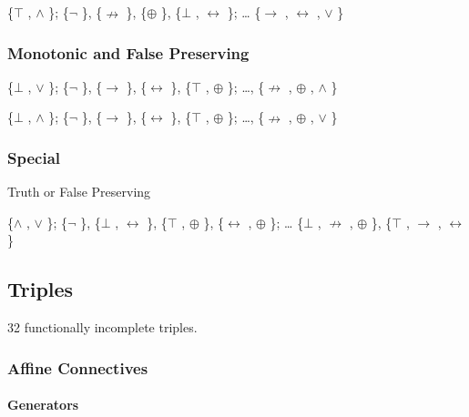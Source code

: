 \{$\top$ , $\land$ \}; \{$\neg$ \}, \{$\nrightarrow$ \}, \{$\oplus$ \}, \{$\bot$ , $\leftrightarrow$ \}; \ldots{} \{$\to$ , $\leftrightarrow$ , $\lor$ \}

\hypertarget{monotonic-and-false-preserving}{%
\subsubsection{Monotonic and False
Preserving}\label{monotonic-and-false-preserving}}

\{$\bot$ , $\lor$ \}; \{$\neg$ \}, \{$\to$ \}, \{$\leftrightarrow$ \}, \{$\top$ , $\oplus$ \}; \ldots, \{$\nrightarrow$ , $\oplus$ , $\land$ \}

\{$\bot$ , $\land$ \}; \{$\neg$ \}, \{$\to$ \}, \{$\leftrightarrow$ \}, \{$\top$ , $\oplus$ \}; \ldots, \{$\nrightarrow$ , $\oplus$ , $\lor$ \}

\hypertarget{section}{%
\subsubsection{}\label{section}}

\hypertarget{special}{%
\subsubsection{Special}\label{special}}

Truth or False Preserving

\{$\land$ , $\lor$ \}; \{$\neg$ \}, \{$\bot$ , $\leftrightarrow$ \}, \{$\top$ , $\oplus$ \}, \{$\leftrightarrow$ , $\oplus$ \}; \ldots{} \{$\bot$ , $\nrightarrow$ , $\oplus$ \},
\{$\top$ , $\to$ , $\leftrightarrow$ \}

\hypertarget{triples-1}{%
\subsection{Triples}\label{triples-1}}

32 functionally incomplete triples.

\hypertarget{affine-connectives}{%
\subsubsection{Affine Connectives}\label{affine-connectives}}

\hypertarget{generators-1}{%
\paragraph{Generators}\label{generators-1}}

